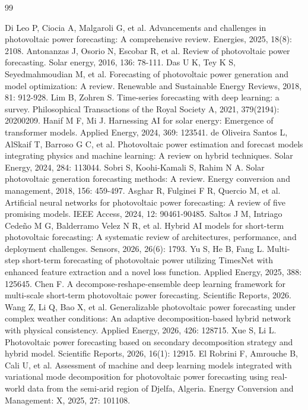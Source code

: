 \documentclass{iopjournal}
\begin{document}
\begin{thebibliography}{99}

 Di Leo P, Ciocia A, Malgaroli G, et al. Advancements and challenges in photovoltaic power forecasting: A comprehensive review. Energies, 2025, 18(8): 2108.
 Antonanzas J, Osorio N, Escobar R, et al. Review of photovoltaic power forecasting. Solar energy, 2016, 136: 78-111.
 Das U K, Tey K S, Seyedmahmoudian M, et al. Forecasting of photovoltaic power generation and model optimization: A review. Renewable and Sustainable Energy Reviews, 2018, 81: 912-928.
 Lim B, Zohren S. Time-series forecasting with deep learning: a survey. Philosophical Transactions of the Royal Society A, 2021, 379(2194): 20200209.
 Hanif M F, Mi J. Harnessing AI for solar energy: Emergence of transformer models. Applied Energy, 2024, 369: 123541.
 de Oliveira Santos L, AlSkaif T, Barroso G C, et al. Photovoltaic power estimation and forecast models integrating physics and machine learning: A review on hybrid techniques. Solar Energy, 2024, 284: 113044.
 Sobri S, Koohi-Kamali S, Rahim N A. Solar photovoltaic generation forecasting methods: A review. Energy conversion and management, 2018, 156: 459-497.
 Asghar R, Fulginei F R, Quercio M, et al. Artificial neural networks for photovoltaic power forecasting: A review of five promising models. IEEE Access, 2024, 12: 90461-90485.
 Saltos J M, Intriago Cede\~no M G, Balderramo Velez N R, et al. Hybrid AI models for short-term photovoltaic forecasting: A systematic review of architectures, performance, and deployment challenges. Sensors, 2026, 26(6): 1793.
 Yu S, He B, Fang L. Multi-step short-term forecasting of photovoltaic power utilizing TimesNet with enhanced feature extraction and a novel loss function. Applied Energy, 2025, 388: 125645.
 Chen F. A decompose-reshape-ensemble deep learning framework for multi-scale short-term photovoltaic power forecasting. Scientific Reports, 2026.
 Wang Z, Li Q, Bao X, et al. Generalizable photovoltaic power forecasting under complex weather conditions: An adaptive decomposition-based hybrid network with physical consistency. Applied Energy, 2026, 426: 128715.
 Xue S, Li L. Photovoltaic power forecasting based on secondary decomposition strategy and hybrid model. Scientific Reports, 2026, 16(1): 12915.
 El Robrini F, Amrouche B, Cali U, et al. Assessment of machine and deep learning models integrated with variational mode decomposition for photovoltaic power forecasting using real-world data from the semi-arid region of Djelfa, Algeria. Energy Conversion and Management: X, 2025, 27: 101108.

\end{thebibliography}
\end{document}
